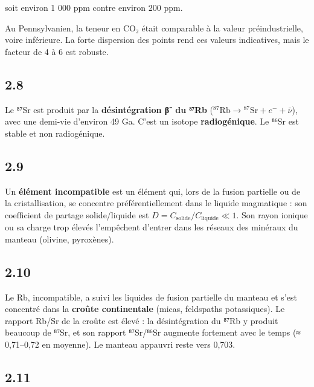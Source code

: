\documentclass[11pt,a4paper]{article}
\newcommand{\equationajustee}[1]{%
  \sbox{\boiteequation}{$\displaystyle #1$}%
  \ifdim\wd\boiteequation>\linewidth
    \[\resizebox{\linewidth}{!}{\usebox{\boiteequation}}\]%
  \else
    \[#1\]%
  \fi}
\begin{document}
\equationajustee{\boxed{[\mathrm{CO_2}]_{\text{\text{Crétacé} sup.}} \approx 5 \times [\mathrm{CO_2}]_{\text{Pennsylvanien}}}}

soit environ 1 000 ppm contre environ 200 ppm.

Au Pennsylvanien, la teneur en CO₂ était comparable à la valeur préindustrielle, voire inférieure. La forte dispersion des points rend ces valeurs indicatives, mais le facteur de 4 à 6 est robuste.

\hypertarget{section-18}{%
\subsection{2.8}\label{section-18}}

Le ⁸⁷Sr est produit par la \textbf{désintégration β⁻ du ⁸⁷Rb} (\(^{87}\mathrm{Rb} \rightarrow {}^{87}\mathrm{Sr} + e^- + \bar\nu\)), avec une demi-vie d'environ 49 Ga. C'est un isotope \textbf{radiogénique}. Le ⁸⁶Sr est stable et non radiogénique.

\hypertarget{section-19}{%
\subsection{2.9}\label{section-19}}

Un \textbf{élément incompatible} est un élément qui, lors de la fusion partielle ou de la cristallisation, se concentre préférentiellement dans le liquide magmatique : son coefficient de partage solide/liquide est \(D = C_{\text{solide}}/C_{\text{liquide}} \ll 1\). Son rayon ionique ou sa charge trop élevés l'empêchent d'entrer dans les réseaux des minéraux du manteau (olivine, pyroxènes).

\hypertarget{section-20}{%
\subsection{2.10}\label{section-20}}

Le Rb, incompatible, a suivi les liquides de fusion partielle du manteau et s'est concentré dans la \textbf{croûte continentale} (micas, feldspaths potassiques). Le rapport Rb/Sr de la croûte est élevé : la désintégration du ⁸⁷Rb y produit beaucoup de ⁸⁷Sr, et son rapport ⁸⁷Sr/⁸⁶Sr augmente fortement avec le temps (≈ 0,71--0,72 en moyenne). Le manteau appauvri reste vers 0,703.

\hypertarget{section-21}{%
\subsection{2.11}\label{section-21}}
\end{document}
